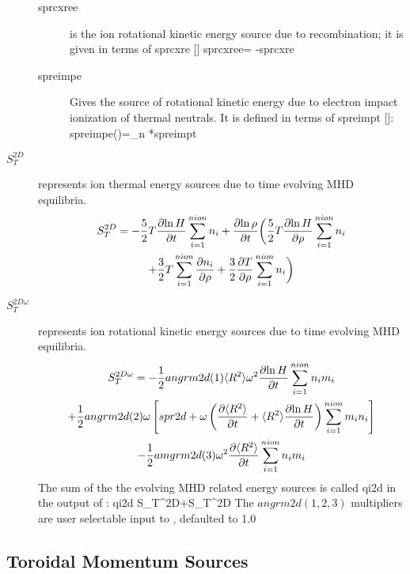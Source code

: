 \begin{description}
\begin{description}
  \item[sprcxree ] is the ion rotational kinetic energy source due to
  recombination; it is given in terms of sprcxre []
  \beq
   sprcxree= -\omega* sprcxre
  \eeq
  \item[spreimpe] Gives the source of rotational kinetic energy due to electron
  impact ionization of thermal neutrals. It is defined in terms of spreimpt
  []:
  \beq
   spreimpe(\rho)=\omega_n *spreimpt
  \eeq
 \end{description}  %
 \item[$S_T^{2D}$ ] represents ion thermal energy sources due to time evolving
 MHD equilibria.
 \begin{multline}
  S_T^{2D}= -\frac{5}{2}T\frac{\partial{ \ln H}}{\partial{ t}} \sum_{i=1}^{nion} n_i
  +\frac{\partial{ \ln \rho}}{\partial{ t}}\bigg (  
   \frac{5}{2}T\frac{\partial{ \ln H}}{\partial{ \rho}}\sum_{i=1}^{nion} n_i \\
   +\frac{3}{2}T\sum_{i=1}^{nion}\frac{\partial{ n_i}}{\partial{ \rho}}
   +\frac{3}{2}\frac{\partial{ T}}{\partial{ \rho}}\sum_{i=1}^{nion} n_i
  \bigg )
 \end{multline}
 \item [$S_T^{2D\omega}$ ] represents ion rotational kinetic energy sources due
 to time evolving MHD equilibria.
 \begin{multline}
  S_T^{2D\omega}= 
  -\frac{1}{2}angrm2d(1)\langle R^2\rangle\omega^2\frac{\partial{ \ln H}}{\partial{ t}}
   \sum_{i=1}^{nion}n_i m_i \\
  +\frac{1}{2}angrm2d(2)\omega\left[spr2d +\omega 
  \left(\frac{\partial{ \langle R^2\rangle}}{\partial{ t}}+\langle R^2\rangle\frac{\partial{ \ln H}}{\partial{ t}}\right)
  \sum_{i=1}^{nion}m_in_i \right] \\
  -\frac{1}{2}amgrm2d(3)\omega^2\frac{\partial{ \langle R^2\rangle}}{\partial{ t}}
  \sum_{i=1}^{nion}n_im_i
 \end{multline}
 The sum of the the evolving MHD related energy sources is called qi2d in the
 output of \ot:
 \beq
  qi2d \equiv S_T^{2D}+S_T^{2D\omega} \label{eq:qi2d}
 \eeq
 The $ angrm2d(1,2,3)$  multipliers are user selectable input to \ot, defaulted
 to 1.0
\end{description}

\subsection{Toroidal Momentum Sources}

